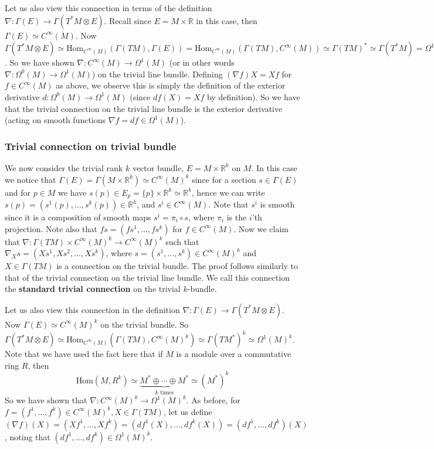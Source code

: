 \documentclass[a4paper]{article}
\theoremstyle{definition} \newtheorem*{definition}{Definition}
\theoremstyle{definition} \newtheorem*{definitions}{Definitions}
\theoremstyle{plain} \newtheorem{theorem}{Theorem}[section]
\theoremstyle{plain} \newtheorem{proposition}[theorem]{Proposition}
\theoremstyle{plain} \newtheorem{corollary}[theorem]{Corollary}
\theoremstyle{plain} \newtheorem{lemma}[theorem]{Lemma}
\theoremstyle{plain} \newtheorem{example}[theorem]{Example}
\newcommand{\defn}[1]{\textbf{#1}}
\newcommand{\realnos}{\mathbb{R}}
\newcommand{\Hom}{\text{Hom}}
\newcommand{\smooth}{C^\infty}
\begin{document}
Let us also view this connection in terms of the definition $\nabla:\Gamma(E)\to \Gamma(T^*M\otimes E)$. Recall since $E=M\times \realnos$ in this case, then $\Gamma(E)\simeq \smooth (M)$. Now $\Gamma(T^*M\otimes E)\simeq \Hom_{\smooth(M)}(\Gamma(TM), \Gamma(E)) = \Hom_{\smooth(M)}(\Gamma(TM), \smooth(M)) \simeq \Gamma(TM)^* \simeq \Gamma(T^*M)=\Omega^1(M)$. So we have shown $\nabla:\smooth(M)\to \Omega^1(M)$ (or in other words $\nabla:\Omega^0(M)\to \Omega^1(M)$) on the trivial line bundle. Defining $(\nabla f)X=Xf$ for $f\in \smooth(M)$ as above, we observe this is simply the definition of the exterior derivative $d:\Omega^0(M)\to \Omega^1(M)$ (since $df(X)=Xf$ by definition). So we have that the trivial connection on the trivial line bundle is the exterior derivative (acting on smooth functions $\nabla f=df \in \Omega^1(M)$). 

\subsubsection{Trivial connection on trivial bundle}
We now consider the trivial rank $k$ vector bundle, $E=M\times \realnos^k$ on $M$. In this case we notice that $\Gamma(E)=\Gamma(M\times \realnos^k)\simeq \smooth (M)^k$ since for a section $s\in \Gamma(E)$ and for $p\in M$ we have $s(p)\in E_p=\{p\}\times \realnos^k\simeq \realnos^k$, hence we can write $s(p)=(s^1(p),\ldots, s^k(p))\in \realnos^k$, and $s^i\in \smooth(M)$. Note that $s^i$ is smooth since it is a composition of smooth maps $s^i=\pi_i\circ s$, where $\pi_i$ is the $i$'th projection. Note also that $fs=(fs^1, \ldots, fs^k)$ for $f\in \smooth(M)$. Now we claim that $\nabla:\Gamma(TM)\times \smooth(M)^k\to \smooth(M)^k$ such that $\nabla_X s = (Xs^1, Xs^2, \ldots, Xs^k)$, where $s=(s^1, \ldots, s^k)\in \smooth (M)^k$ and $X\in \Gamma(TM)$ is a connection on the trivial bundle. The proof follows similarly to that of the trivial connection on the trivial line bundle. We call this connection the \defn{standard trivial connection} on the trivial $k$-bundle. 

Let us also view this connection in the definition $\nabla:\Gamma(E)\to \Gamma(T^*M\otimes E)$. Now $\Gamma(E)\simeq \smooth(M)^k$ on the trivial bundle. So  $\Gamma(T^*M\otimes E)\simeq \Hom_{\smooth(M)}(\Gamma(TM), \smooth(M)^k)\simeq \Gamma(TM^*)^k \simeq \Omega^1(M)^k$. Note that we have used the fact here that if $M$ is a module over a commutative ring $R$, then 
$$\Hom(M, R^k)\simeq \underbrace{M^*\oplus \cdots \oplus M^*}_{k \text{ times}} \simeq (M^*)^{k}$$
So we have shown that $\nabla:\smooth(M)^k\to \Omega^1(M)^k$. As before, for $f=(f^1, \ldots, f^k)\in \smooth(M)^k, X\in \Gamma(TM)$, let us define $(\nabla f)(X)=(Xf^1, \ldots, Xf^k)=(df^1(X), \ldots, df^k(X))=(df^1, \ldots, df^k)(X)$, noting that $(df^1, \ldots, df^k)\in \Omega^1(M)^k$.
\end{document}
